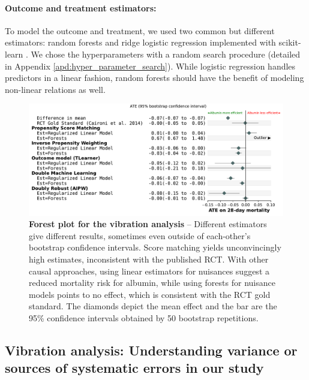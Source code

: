 \documentclass[french,12pt,twoside,a4paper]{book}
\begin{document}
\paragraph{Outcome and treatment estimators:}

To model the outcome and treatment, we used two common but different estimators:
random forests and ridge logistic regression implemented with scikit-learn
\citep{pedregosa_scikitlearn_2011}. We chose the hyperparameters with a random search
procedure (detailed in Appendix \ref{apd:hyper_parameter_search}). While
logistic regression handles predictors in a linear fashion, random forests
should have the benefit of modeling non-linear relations as well.

\begin{figure}[h!]
  \centering
  \includegraphics[width=\linewidth]{img/chapter_4/albumin_for_sepsis__obs_1d__estimates_20230712__est_lr_rf__bs_50.pdf}
  \caption{\textbf{Forest plot for the vibration analysis} -- Different
    estimators give different results, sometimes even outside of
    each-other's bootstrap confidence intervals. Score matching yields
    unconvincingly high estimates, inconsistent with the published RCT.
    With other causal approaches, using linear estimators for nuisances
    suggest a reduced mortality risk for albumin, while using forests for
    nuisance models points to no effect, which is consistent with the RCT gold standard.
    The diamonds
    depict the mean effect and the bar are the 95\% confidence intervals
    obtained by 50 bootstrap repetitions.}\label{fig:albumin_for_sepsis:results}
\end{figure}

\subsection{Vibration analysis: Understanding variance or sources of
  systematic errors in our study}\label{subsec:causal_tuto:vibration_mimic}
\end{document}
